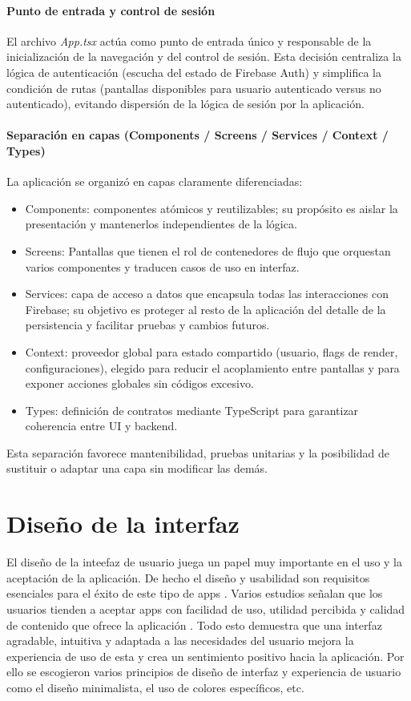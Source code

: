 \documentclass[twoside, openright, 11pt]{report}
\begin{document}
		\paragraph{Punto de entrada y control de sesión}
		El archivo \textit{App.tsx} actúa como punto de entrada único y responsable de la inicialización de la navegación y del control de sesión. Esta decisión centraliza la lógica de autenticación (escucha del estado de Firebase Auth) y simplifica la condición de rutas (pantallas disponibles para usuario autenticado versus no autenticado), evitando dispersión de la lógica de sesión por la aplicación.
		
		\paragraph{Separación en capas (Components / Screens / Services / Context / Types)}
		La aplicación se organizó en capas claramente diferenciadas:
		\begin{itemize}
			\item Components: componentes atómicos y reutilizables; su propósito es aislar la presentación y mantenerlos independientes de la lógica.
			\item Screens: Pantallas que tienen el rol de contenedores de flujo que orquestan varios componentes y traducen casos de uso en interfaz.
			\item Services: capa de acceso a datos que encapsula todas las interacciones con Firebase; su objetivo es proteger al resto de la aplicación del detalle de la persistencia y facilitar pruebas y cambios futuros.
			\item Context: proveedor global para estado compartido (usuario, flags de render, configuraciones), elegido para reducir el acoplamiento entre pantallas y para exponer acciones globales sin códigos excesivo.
			\item Types: definición de contratos mediante TypeScript para garantizar coherencia entre UI y backend.
		\end{itemize}
		Esta separación favorece mantenibilidad, pruebas unitarias y la posibilidad de sustituir o adaptar una capa sin modificar las demás.
	  
	
	\section{Diseño de la interfaz}
		El diseño de la inteefaz de usuario juega un papel muy importante en el uso y la aceptación de la aplicación. De hecho el diseño y usabilidad son requisitos esenciales para el éxito de este tipo de apps \cite{liew2019usability}. Varios estudios señalan que los usuarios tienden a aceptar apps con facilidad de uso, utilidad percibida y calidad de contenido que ofrece la aplicación \cite{Lim2025CuestionarioUsabilidad}. Todo esto demuestra que una interfaz agradable, intuitiva y adaptada a las necesidades del usuario mejora la experiencia de uso de esta y crea un sentimiento positivo hacia la aplicación. Por ello se escogieron varios principios de diseño de interfaz y experiencia de usuario como el diseño minimalista, el uso de colores específicos, etc.
		
\end{document}
